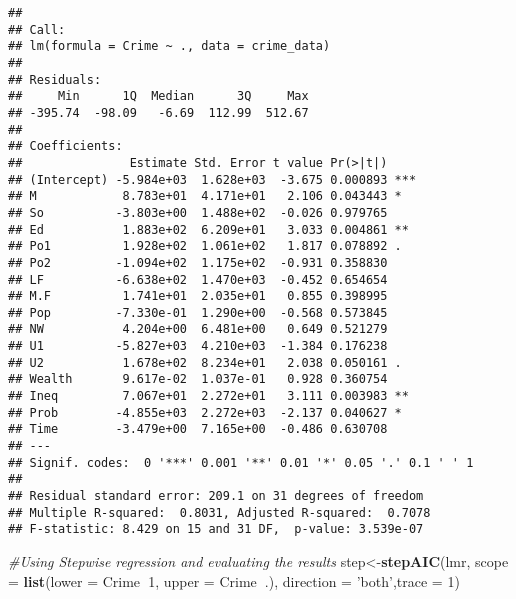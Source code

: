 \documentclass[
]{article}
\newenvironment{Shaded}{\begin{snugshade}}{\end{snugshade}}
\newcommand{\CommentTok}[1]{\textcolor[rgb]{0.56,0.35,0.01}{\textit{#1}}}
\newcommand{\DataTypeTok}[1]{\textcolor[rgb]{0.13,0.29,0.53}{#1}}
\newcommand{\DecValTok}[1]{\textcolor[rgb]{0.00,0.00,0.81}{#1}}
\newcommand{\KeywordTok}[1]{\textcolor[rgb]{0.13,0.29,0.53}{\textbf{#1}}}
\newcommand{\NormalTok}[1]{#1}
\newcommand{\OperatorTok}[1]{\textcolor[rgb]{0.81,0.36,0.00}{\textbf{#1}}}
\newcommand{\StringTok}[1]{\textcolor[rgb]{0.31,0.60,0.02}{#1}}
\begin{document}
\begin{verbatim}
## 
## Call:
## lm(formula = Crime ~ ., data = crime_data)
## 
## Residuals:
##     Min      1Q  Median      3Q     Max 
## -395.74  -98.09   -6.69  112.99  512.67 
## 
## Coefficients:
##               Estimate Std. Error t value Pr(>|t|)    
## (Intercept) -5.984e+03  1.628e+03  -3.675 0.000893 ***
## M            8.783e+01  4.171e+01   2.106 0.043443 *  
## So          -3.803e+00  1.488e+02  -0.026 0.979765    
## Ed           1.883e+02  6.209e+01   3.033 0.004861 ** 
## Po1          1.928e+02  1.061e+02   1.817 0.078892 .  
## Po2         -1.094e+02  1.175e+02  -0.931 0.358830    
## LF          -6.638e+02  1.470e+03  -0.452 0.654654    
## M.F          1.741e+01  2.035e+01   0.855 0.398995    
## Pop         -7.330e-01  1.290e+00  -0.568 0.573845    
## NW           4.204e+00  6.481e+00   0.649 0.521279    
## U1          -5.827e+03  4.210e+03  -1.384 0.176238    
## U2           1.678e+02  8.234e+01   2.038 0.050161 .  
## Wealth       9.617e-02  1.037e-01   0.928 0.360754    
## Ineq         7.067e+01  2.272e+01   3.111 0.003983 ** 
## Prob        -4.855e+03  2.272e+03  -2.137 0.040627 *  
## Time        -3.479e+00  7.165e+00  -0.486 0.630708    
## ---
## Signif. codes:  0 '***' 0.001 '**' 0.01 '*' 0.05 '.' 0.1 ' ' 1
## 
## Residual standard error: 209.1 on 31 degrees of freedom
## Multiple R-squared:  0.8031, Adjusted R-squared:  0.7078 
## F-statistic: 8.429 on 15 and 31 DF,  p-value: 3.539e-07
\end{verbatim}

\begin{Shaded}
\begin{Highlighting}[]
\CommentTok{#Using Stepwise regression and evaluating the results}
\NormalTok{step<-}\KeywordTok{stepAIC}\NormalTok{(lmr, }\DataTypeTok{scope =} \KeywordTok{list}\NormalTok{(}\DataTypeTok{lower =}\NormalTok{ Crime}\OperatorTok{~}\DecValTok{1}\NormalTok{, }\DataTypeTok{upper =}\NormalTok{ Crime}\OperatorTok{~}\NormalTok{.),}
              \DataTypeTok{direction =} \StringTok{'both'}\NormalTok{,}\DataTypeTok{trace =} \DecValTok{1}\NormalTok{)}
\end{Highlighting}
\end{Shaded}
\end{document}
